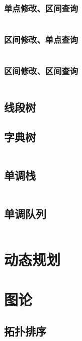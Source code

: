 \documentclass[a4paper,11pt]{article}
\begin{document}
\subsubsection{单点修改、区间查询}
\inputminted[linenos,autogobble]{java}{data-structure/binary-indexed-tree-1.java}

\subsubsection{区间修改、单点查询}
\inputminted[linenos,autogobble]{java}{data-structure/binary-indexed-tree-2.java}

\subsubsection{区间修改、区间查询}
\inputminted[linenos,autogobble]{java}{data-structure/binary-indexed-tree-3.java}

\newpage
\subsection{线段树}

\newpage
\subsection{字典树}
\inputminted[linenos,autogobble]{java}{data-structure/trie.java}

\newpage
\subsection{单调栈}
\inputminted[linenos,autogobble]{java}{data-structure/monotone-stack.java}

\newpage
\subsection{单调队列}
\inputminted[linenos,autogobble]{java}{data-structure/monotone-queue.java}


\newpage
\section{动态规划}


\newpage
\section{图论}

\subsection{拓扑排序}
\inputminted[linenos,autogobble]{java}{graph/topo.java}
\end{document}
